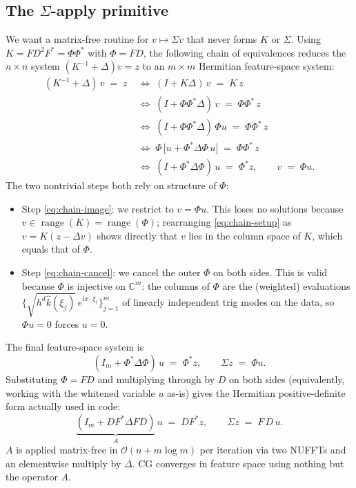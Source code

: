 \documentclass{article}
\newcommand{\C}{\mathbb{C}}
\newcommand{\calO}{\mathcal{O}}
\begin{document}
\subsection{The $\Sigma$-apply primitive}
\label{sec:sigma-apply}
We want a matrix-free routine for $v\mapsto\Sigma v$ that never forms $K$ or $\Sigma$. Using $K=FD^{2}F^{*}=\Phi\Phi^{*}$ with $\Phi=FD$, the following chain of equivalences reduces the $n\times n$ system $(K^{-1}+\Delta)v=z$ to an $m\times m$ Hermitian feature-space system:
\begin{align}
  (K^{-1}+\Delta)\,v \;=\; z
  &\;\Longleftrightarrow\;
  (I+K\Delta)\,v \;=\; K\,z
  \label{eq:chain-setup}\\
  &\;\Longleftrightarrow\;
  (I+\Phi\Phi^{*}\Delta)\,v \;=\; \Phi\Phi^{*}\,z
  \label{eq:chain-phi}\\
  &\;\Longleftrightarrow\;
  (I+\Phi\Phi^{*}\Delta)\,\Phi u \;=\; \Phi\Phi^{*}\,z
  \label{eq:chain-image}\\
  &\;\Longleftrightarrow\;
  \Phi\,\bigl[u + \Phi^{*}\Delta\Phi\,u\bigr] \;=\; \Phi\Phi^{*}\,z
  \label{eq:chain-factor}\\
  &\;\Longleftrightarrow\;
  (I+\Phi^{*}\Delta\Phi)\,u \;=\; \Phi^{*}z,
  \qquad v \;=\; \Phi u.
  \label{eq:chain-cancel}
\end{align}
The two nontrivial steps both rely on structure of $\Phi$:
\begin{itemize}[leftmargin=1.4em,itemsep=1pt]
  \item Step \eqref{eq:chain-image}: we restrict to $v=\Phi u$. This loses no solutions because $v\in\operatorname{range}(K)=\operatorname{range}(\Phi)$; rearranging \eqref{eq:chain-setup} as $v = K(z-\Delta v)$ shows directly that $v$ lies in the column space of $K$, which equals that of $\Phi$.
  \item Step \eqref{eq:chain-cancel}: we cancel the outer $\Phi$ on both sides. This is valid because $\Phi$ is injective on $\C^{m}$: the columns of $\Phi$ are the (weighted) evaluations $\{\sqrt{h^{d}\hat k(\xi_j)}\,e^{i x\cdot\xi_j}\}_{j=1}^{m}$ of linearly independent trig modes on the data, so $\Phi u = 0$ forces $u=0$.
\end{itemize}

The final feature-space system is
\[
  \boxed{\;
    (I_{m}+\Phi^{*}\Delta\Phi)\,u \;=\; \Phi^{*}z,
    \qquad
    \Sigma z \;=\; \Phi u.
  \;}
\]
Substituting $\Phi = FD$ and multiplying through by $D$ on both sides (equivalently, working with the whitened variable $u$ as-is) gives the Hermitian positive-definite form actually used in code:
\begin{equation}
  \underbrace{(I_{m} + D F^{*}\Delta F D)}_{A}\,u \;=\; D F^{*} z,
  \qquad
  \Sigma z \;=\; F\,D\,u.
  \label{eq:sigma-apply}
\end{equation}
$A$ is applied matrix-free in $\calO(n+m\log m)$ per iteration via two NUFFTs and an elementwise multiply by $\Delta$. CG converges in feature space using nothing but the operator $A$.
\end{document}
